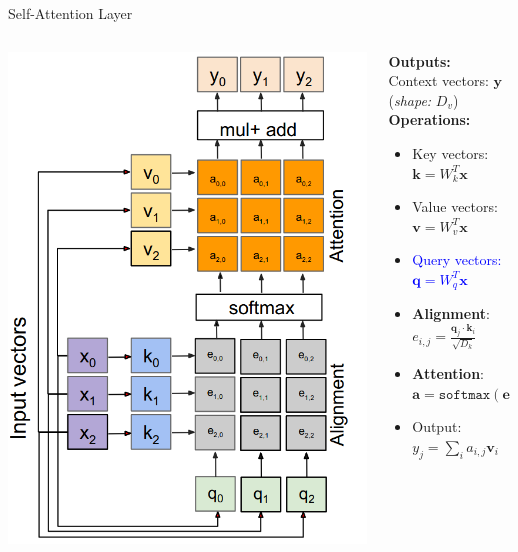 \documentclass[serif, aspectratio=169]{beamer}
\begin{document}
\begin{frame}{Self-Attention Layer}
	\begin{columns}
		\begin{column}{0.35\textwidth}
			\centering
			\includegraphics[width=\textwidth]{pic/self-attention-s-1.png} 
			\vspace{0.5em}
		\end{column}
		
		\begin{column}{0.58\textwidth}
			\textbf{Outputs:} \\
			Context vectors: $\mathbf{y}$ (\textit{shape: } $D_v$) \\[1em]
			
			\textbf{Operations:}
			\begin{itemize}
				\item Key vectors: $\mathbf{k} = W_k^T \mathbf{x}$
				\item Value vectors: $\mathbf{v} = W_v^T \mathbf{x}$
				\item \textcolor{blue}{Query vectors: $\mathbf{q} = W_q^T \mathbf{x}$}
				\item \textbf{Alignment}: $e_{i,j} = \frac{\mathbf{q}_j \cdot \mathbf{k}_i}{\sqrt{D_k}}$
				\item \textbf{Attention}: $\mathbf{a} = \texttt{softmax}(\mathbf{e})$
				\item Output: $y_j = \sum_i a_{i,j} \mathbf{v}_i$
			\end{itemize}
			

\end{column}
\end{columns}
\end{frame}
\end{document}
